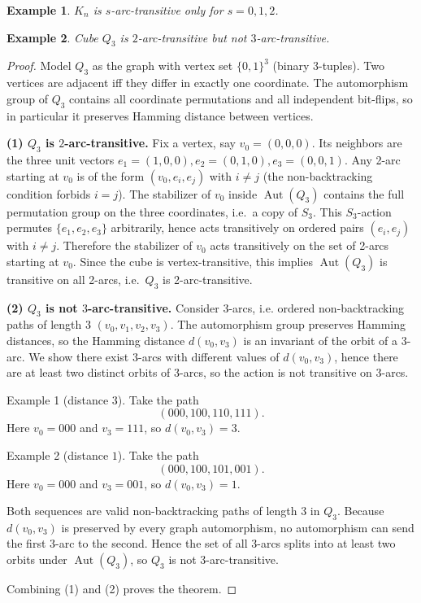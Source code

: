 \documentclass[12pt,a4paper,openany]{book}
\newtheorem{example}{Example}[section]
\begin{document}
\begin{example}
    $K_n$ is $s$-arc-transitive only for $s = 0,1,2$.
\end{example}

\begin{example}
    Cube $Q_3$ is $2$-arc-transitive but not $3$-arc-transitive.
\end{example}

\begin{proof}
Model \(Q_3\) as the graph with vertex set \(\{0,1\}^3\) (binary
3-tuples). Two vertices are adjacent iff they differ in exactly one
coordinate. The automorphism group of \(Q_3\) contains all coordinate
permutations and all independent bit-flips, so in particular it preserves
Hamming distance between vertices.

\medskip\noindent\textbf{(1) $Q_3$ is $2$-arc-transitive.}  
Fix a vertex, say \(v_0=(0,0,0)\). Its neighbors are the three unit
vectors \(e_1=(1,0,0), e_2=(0,1,0), e_3=(0,0,1)\). Any 2-arc starting at
\(v_0\) is of the form \((v_0,e_i,e_j)\) with \(i\neq j\) (the
non-backtracking condition forbids \(i=j\)). The stabilizer of \(v_0\)
inside \(\operatorname{Aut}(Q_3)\) contains the full permutation group
on the three coordinates, i.e.\ a copy of \(S_3\). This \(S_3\)-action
permutes \(\{e_1,e_2,e_3\}\) arbitrarily, hence acts transitively on
ordered pairs \((e_i,e_j)\) with \(i\neq j\). Therefore the stabilizer
of \(v_0\) acts transitively on the set of 2-arcs starting at \(v_0\).
Since the cube is vertex-transitive, this implies \(\operatorname{Aut}(Q_3)\)
is transitive on all 2-arcs, i.e.\ \(Q_3\) is 2-arc-transitive.

\medskip\noindent\textbf{(2) $Q_3$ is not $3$-arc-transitive.}  
Consider 3-arcs, i.e. ordered non-backtracking paths of length 3
\((v_0,v_1,v_2,v_3)\). The automorphism group preserves Hamming distances,
so the Hamming distance \(d(v_0,v_3)\) is an invariant of the orbit of
a 3-arc. We show there exist 3-arcs with different values of
\(d(v_0,v_3)\), hence there are at least two distinct orbits of
3-arcs, so the action is not transitive on 3-arcs.

Example 1 (distance \(3\)). Take the path
\[
(000,100,110,111).
\]
Here \(v_0=000\) and \(v_3=111\), so \(d(v_0,v_3)=3\).

Example 2 (distance \(1\)). Take the path
\[
(000,100,101,001).
\]
Here \(v_0=000\) and \(v_3=001\), so \(d(v_0,v_3)=1\).

Both sequences are valid non-backtracking paths of length \(3\) in
\(Q_3\). Because \(d(v_0,v_3)\) is preserved by every graph automorphism,
no automorphism can send the first 3-arc to the second. Hence the set
of all 3-arcs splits into at least two orbits under
\(\operatorname{Aut}(Q_3)\), so \(Q_3\) is not 3-arc-transitive.

Combining (1) and (2) proves the theorem.
\end{proof}
\end{document}

